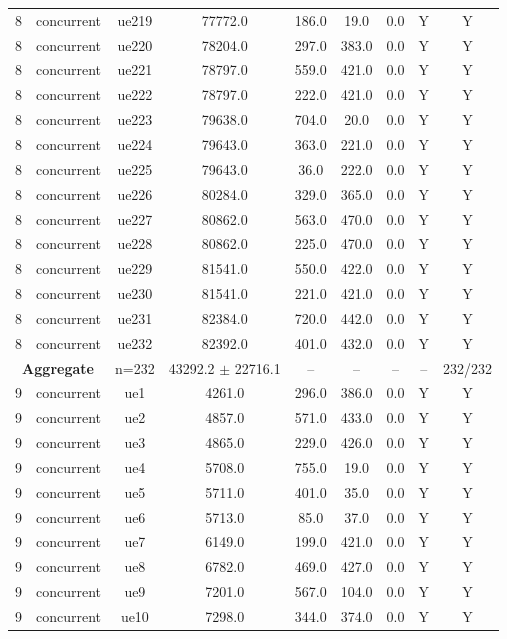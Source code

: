 \begin{table}[ht]
\begin{tabular}{|c|c|c|c|c|c|c|c|c|}
8 & concurrent & ue219 & 77772.0 & 186.0 & 19.0 & 0.0 & Y & Y \\
8 & concurrent & ue220 & 78204.0 & 297.0 & 383.0 & 0.0 & Y & Y \\
8 & concurrent & ue221 & 78797.0 & 559.0 & 421.0 & 0.0 & Y & Y \\
8 & concurrent & ue222 & 78797.0 & 222.0 & 421.0 & 0.0 & Y & Y \\
8 & concurrent & ue223 & 79638.0 & 704.0 & 20.0 & 0.0 & Y & Y \\
8 & concurrent & ue224 & 79643.0 & 363.0 & 221.0 & 0.0 & Y & Y \\
8 & concurrent & ue225 & 79643.0 & 36.0 & 222.0 & 0.0 & Y & Y \\
8 & concurrent & ue226 & 80284.0 & 329.0 & 365.0 & 0.0 & Y & Y \\
8 & concurrent & ue227 & 80862.0 & 563.0 & 470.0 & 0.0 & Y & Y \\
8 & concurrent & ue228 & 80862.0 & 225.0 & 470.0 & 0.0 & Y & Y \\
8 & concurrent & ue229 & 81541.0 & 550.0 & 422.0 & 0.0 & Y & Y \\
8 & concurrent & ue230 & 81541.0 & 221.0 & 421.0 & 0.0 & Y & Y \\
8 & concurrent & ue231 & 82384.0 & 720.0 & 442.0 & 0.0 & Y & Y \\
8 & concurrent & ue232 & 82392.0 & 401.0 & 432.0 & 0.0 & Y & Y \\
\multicolumn{2}{|c|}{\textbf{Aggregate}} & n=232 & 43292.2 $\pm$ 22716.1 & -- & -- & -- & -- & 232/232 \\
\hline
9 & concurrent & ue1 & 4261.0 & 296.0 & 386.0 & 0.0 & Y & Y \\
9 & concurrent & ue2 & 4857.0 & 571.0 & 433.0 & 0.0 & Y & Y \\
9 & concurrent & ue3 & 4865.0 & 229.0 & 426.0 & 0.0 & Y & Y \\
9 & concurrent & ue4 & 5708.0 & 755.0 & 19.0 & 0.0 & Y & Y \\
9 & concurrent & ue5 & 5711.0 & 401.0 & 35.0 & 0.0 & Y & Y \\
9 & concurrent & ue6 & 5713.0 & 85.0 & 37.0 & 0.0 & Y & Y \\
9 & concurrent & ue7 & 6149.0 & 199.0 & 421.0 & 0.0 & Y & Y \\
9 & concurrent & ue8 & 6782.0 & 469.0 & 427.0 & 0.0 & Y & Y \\
9 & concurrent & ue9 & 7201.0 & 567.0 & 104.0 & 0.0 & Y & Y \\
9 & concurrent & ue10 & 7298.0 & 344.0 & 374.0 & 0.0 & Y & Y \\

\end{tabular}
\end{table}
